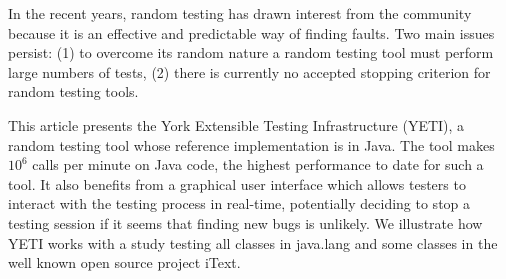 In the recent years, random testing has drawn interest from the community because it is an effective and predictable way of finding faults. Two main issues persist: (1) to overcome its random nature a random testing tool must perform large numbers of tests, (2) there is currently no accepted stopping criterion for random testing tools.

This article presents the York Extensible Testing Infrastructure (YETI), a random testing tool whose reference implementation is in Java. The tool makes $10^6$ calls per minute on Java code, the highest performance to date for such a tool. It also benefits from a graphical user interface which allows testers to interact with the testing process in real-time, potentially deciding to stop a testing session if it seems that finding new bugs is unlikely. We illustrate how YETI works with a study testing all classes in java.lang and some classes in the well known open source project iText.
 